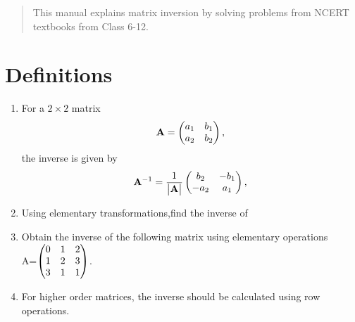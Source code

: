 \documentclass[journal,12pt,twocolumn]{IEEEtran}
\renewcommand\thesection{\arabic{section}}
\begin{document}



%

\begin{abstract}
This manual explains matrix inversion by solving problems from NCERT textbooks from Class 6-12.  
\end{abstract}
%
\section{Definitions}
\renewcommand{\theequation}{\theenumi}
\begin{enumerate}[label=\thesection.\arabic*.,ref=\thesection.\theenumi]
\item For a $2 \times 2$ matrix 
\begin{align}
	\mathbf{A} = \begin{pmatrix} a_1 & b_1  \\ a_2 & b_2 \end{pmatrix},
\end{align}
the inverse is given by 
\begin{align}
	\mathbf{A}^{-1} = \frac{1}{\begin{vmatrix}\mathbf{A}\end{vmatrix}}\begin{pmatrix} b_2 & -b_1  \\ -a_2 & a_1 \end{pmatrix},
\end{align}
\item Using elementary transformations,find the inverse of   
\\
  \solution
  
\item Obtain the inverse of the following matrix using elementary operations\\
  A=$\begin{pmatrix} 0 &1 &2\\1 &2 &3\\3 &1 &1\end{pmatrix}$.\\
  \solution
   
\item For higher order matrices, the inverse should be calculated using row operations.
\end{enumerate}
\end{document}
